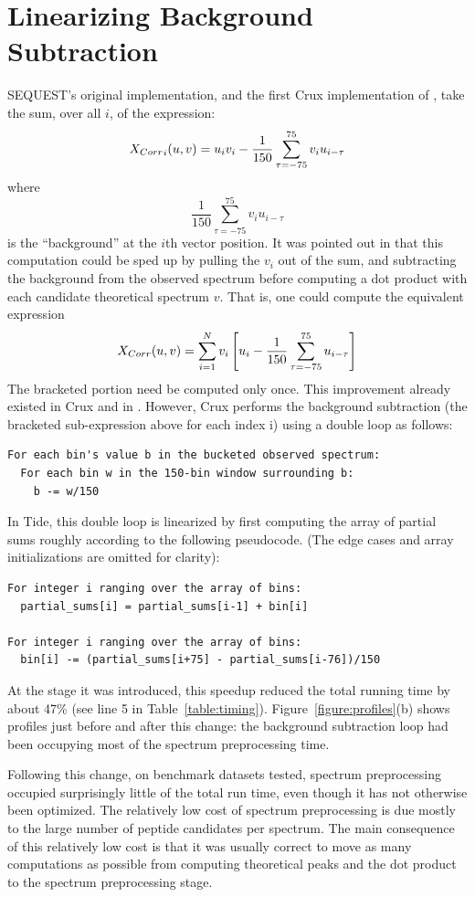\section{Linearizing Background Subtraction \label{section:linearize-bkgnd-sub}}

SEQUEST's original implementation, and the first Crux implementation
of \XCorr, take the sum, over all $i$, of the expression:
\[
\mbox{\ensuremath{X_{Corr}}}_i(u,v)=u_iv_i-\frac{1}{150}\sum_{\tau=-75}^{75}{v_iu_{i-\tau}}
\]
where
\[\frac{1}{150}\sum_{\tau=-75}^{75}{v_iu_{i-\tau}}\]
is the ``background'' at the $i$th vector position. It was pointed
out in \cite{eng:fast} that this computation could be sped up by
pulling the $v_i$ out of the sum, and subtracting the background from the
observed spectrum before computing a dot product with each candidate
theoretical spectrum $v$. That is, one could compute the equivalent
expression
\[
X_{Corr}(u,v)=\sum_{i=1}^{N}{v_i\left[u_i-\frac{1}{150}\sum_{\tau=-75}^{75}{u_{i-\tau}}\right]}
\]
The bracketed portion need be computed only once. This improvement
already existed in Crux and in \tidezero. However, Crux performs the
background subtraction (the bracketed sub-expression above for each
index i) using a double loop as follows:

\begin{verbatim}
For each bin's value b in the bucketed observed spectrum:
  For each bin w in the 150-bin window surrounding b:
    b -= w/150
\end{verbatim}

In Tide, this double loop is linearized by first computing the array
of partial sums roughly according to the following pseudocode. (The
edge cases and array initializations are omitted for clarity):

\begin{verbatim}
For integer i ranging over the array of bins:
  partial_sums[i] = partial_sums[i-1] + bin[i]

For integer i ranging over the array of bins:
  bin[i] -= (partial_sums[i+75] - partial_sums[i-76])/150
\end{verbatim}

At the stage it was introduced, this speedup reduced the total running
time by about 47\% (see line 5 in Table~\ref{table:timing}).
Figure~\ref{figure:profiles}(b) shows profiles just before and after this
change: the background subtraction loop had been occupying most of the
spectrum preprocessing time.

Following this change, on benchmark datasets tested, spectrum
preprocessing occupied surprisingly little of the total run time, even
though it has not otherwise been optimized. The relatively low cost of
spectrum preprocessing is due mostly to the large number of peptide
candidates per spectrum. The main consequence of this relatively low
cost is that it was usually correct to move as many computations as
possible from computing theoretical peaks and the dot product to the
spectrum preprocessing stage.

